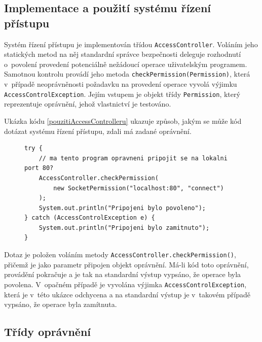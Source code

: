 \subsection{Implementace a použití systému řízení přístupu}\label{implementaceAC}

Systém řízení přístupu je implementován třídou {\tt AccessController}. Voláním jeho statických metod na něj standardní správce bezpečnosti deleguje rozhodnutí o~povolení provedení potenciálně nežádoucí operace uživatelským programem. Samotnou kontrolu provádí jeho metoda {\tt checkPermission(Permission)}, která v~případě neoprávněnosti požadavku na provedení operace vyvolá výjimku {\tt AccessControlException}. Jejím vstupem je objekt třídy {\tt Permission}, který reprezentuje oprávnění, jehož vlastnictví je testováno. \cite{oaks}

Ukázka kódu \ref{pouzitiAccessControlleru} ukazuje způsob, jakým se může kód dotázat systému řízení přístupu, zdali má zadané oprávnění. \cite{oaks}

\begin{figure}[tbh]
\begin{lstlisting}[caption=Příklad položení dotazu systému řízení přístupu, label=pouzitiAccessControlleru]
try {
    // ma tento program opravneni pripojit se na lokalni port 80?
    AccessController.checkPermission(
        new SocketPermission("localhost:80", "connect")
    );
    System.out.println("Pripojeni bylo povoleno");
} catch (AccessControlException e) {
    System.out.println("Pripojeni bylo zamitnuto");
}
\end{lstlisting}
\end{figure}

Dotaz je položen voláním metody {\tt AccessController.checkPermission()}, přičemž je jako parametr připojen objekt oprávnění.
Má-li kód toto oprávnění, provádění pokračuje a je tak na standardní výstup vypsáno, že operace byla povolena.
V~opačném případě je vyvolána výjimka {\tt AccessControlException}, která je v~této ukázce odchycena a na standardní výstup je v~takovém případě vypsáno, že operace byla zamítnuta.

\subsection{Třídy oprávnění}


